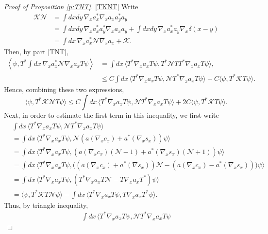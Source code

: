 \documentclass[11pt,a4paper]{scrartcl}
\newcommand{\N}{\mathcal{N}}
\newcommand{\K}{\mathcal{K}}
\begin{document}
\begin{proof}[Proof of Proposition \ref{p:TNT}]
  \eqref{TKNT} Write
  \begin{align*}
    \K \N & = \int dx dy \, \nabla_x a_x^* \nabla_x a_x a_y^* a_y \\
    & = \int dx dy \, \nabla_x a_x^* a_y^* \nabla_x a_x a_y + \int dx dy \,
    \nabla_x a_x^* a_y \nabla_x \delta(x-y) \\
    & = \int dx \, \nabla_x a_x^* \N \nabla_x a_x + \K.
  \end{align*}
  Then, by part \eqref{TNT},
  \begin{align*}
    \left \langle \psi, T^* \int dx \, \nabla_x a_x^* \N \nabla_x a_x T \psi
    \right \rangle & = \int dx \, \langle T^* \nabla_x a_x T \psi, T^* \N T
    T^* \nabla_x a_x T \psi \rangle, \\
    & \le C \int dx \, \langle T^* \nabla_x a_x T \psi, \N T^* \nabla_x a_x
    T \psi \rangle + C \langle \psi, T^* \K T \psi \rangle.
  \end{align*}
  Hence, combining these two expressions,
  \begin{equation}
    \label{ep5}
    \langle \psi, T^* \K \N T \psi \rangle \le C \int dx \, \langle T^*
    \nabla_x a_x T \psi, \N T^* \nabla_x a_x T \psi \rangle + 2C \langle
    \psi, T^* \K T \psi \rangle.
  \end{equation}
  Next, in order to estimate the first term in this inequality, we first write
  \begin{align*}
    & \int dx \, \langle T^* \nabla_x a_x T \psi, \N T^* \nabla_x a_x T \psi
    \rangle \\
    & = \int dx \, \langle T^* \nabla_x a_x T \psi, \N ( a(\nabla_x c_x) +
    a^*(\nabla_x s_x) ) \psi \rangle \\
    & = \int dx \, \langle T^* \nabla_x a_x T \psi, ( a(\nabla_x c_x) (\N-1) +
    a^*(\nabla_x s_x) (\N+1) ) \psi \rangle \\
    & = \int dx \, \langle T^* \nabla_x a_x T \psi, \big( (a(\nabla_x c_x) +
    a^*(\nabla s_x)) \N - (a(\nabla_x c_x) - a^*(\nabla_x s_x)) \big) \psi
    \rangle \\
    & = \int dx \, \langle T^* \nabla_x a_x T \psi, ( T^* \nabla_x a_x T \N -
    T \nabla_x a_x T^* ) \psi \rangle \\
    & = \langle \psi, T^* \K T \N \psi \rangle - \int dx \, \langle T^*
    \nabla_x a_x T \psi, T \nabla_x a_x T^* \psi \rangle.
  \end{align*}
  Thus, by triangle inequality,
  \begin{align*}
    \int dx \, \langle T^* \nabla_x a_x T \psi, \N T^* \nabla_x a_x T \psi

\end{align*}
\end{proof}
\end{document}
